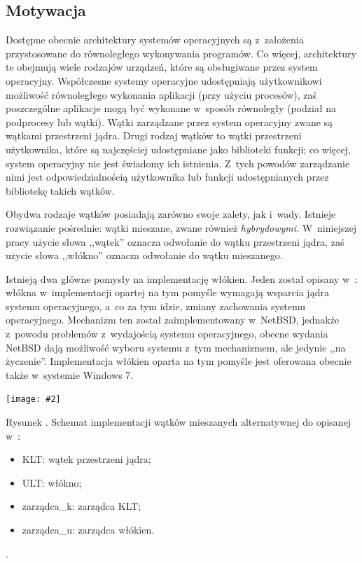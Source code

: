 \documentclass[11pt,makeidx]{mwart}
\newcounter{figmain}
\newcommand{\myownfigure}[4]{ \newcounter{#1} \setcounter{#1}{\value{figmain}} \addtocounter{figmain}{1} \begin{center} \label{fig:#1} \centering \texttt{[image: \#2]}\\ \begin{flushleft}Rysunek \arabic{#1}. #3.\end{flushleft} \end{center}}
\begin{document}
\subsection{Motywacja}
\indent
	Dostępne obecnie architektury systemów operacyjnych są z~założenia przystosowane do równoległego
	wykonywania programów. Co więcej, architektury te obejmują wiele rodzajów urządzeń, które są obsługiwane przez system operacyjny.
	Współczesne systemy operacyjne udostępniają użytkownikowi możliwość równoległego wykonania aplikacji (przy użyciu procesów),
	zaś poszczególne aplikacje mogą być wykonane w~sposób równoległy (podział na podprocesy lub wątki). Wątki zarządzane przez system operacyjny
	zwane są wątkami przestrzeni jądra.
	Drugi rodzaj wątków to wątki przestrzeni użytkownika, które są najczęściej udostępniane jako biblioteki funkcji; co więcej, system operacyjny
	nie jest świadomy ich istnienia. Z~tych powodów zarządzanie nimi jest odpowiedzialnością użytkownika lub funkcji udostępnianych przez
	bibliotekę takich wątków.
\par
%
\indent
	Obydwa rodzaje wątków posiadają zarówno swoje zalety, jak i~wady. Istnieje rozwiązanie pośrednie: wątki mieszane, zwane również
	\emph{hybrydowymi}. W~niniejszej pracy użycie słowa ,,wątek'' oznacza odwołanie do wątku przestrzeni jądra, zaś użycie słowa ,,włókno'' oznacza odwołanie
  do wątku mieszanego.
\par
%
\indent
	Istnieją dwa główne pomysły na implementację włókien. Jeden został opisany w~\cite{anderson}: włókna w~implementacji opartej na 
  tym pomyśle wymagają wsparcia jądra systemu operacyjnego, a~co za tym idzie, zmiany zachowania systemu operacyjnego.
  Mechanizm ten został zaimplementowany w~NetBSD, jednakże z~powodu problemów z~wydajością systemu operacyjnego, obecne wydania NetBSD
  dają możliwość wyboru systemu z~tym mechanizmem, ale jedynie ,,na życzenie''.
  Implementacja włókien oparta na tym pomyśle jest oferowana obecnie także w~systemie Windows 7.
\par
%
\indent
  \myownfigure{mixedintro}{mixedscheme.png}{Schemat implementacji wątków mieszanych alternatywnej do opisanej w~\cite{anderson}:
  \begin{itemize}
    \item KLT: wątek przestrzeni jądra;
    \item ULT: włókno;
    \item zarządca\_k: zarządca KLT;
    \item zarządca\_u: zarządca włókien.
  \end{itemize}}{.21}
\end{document}
